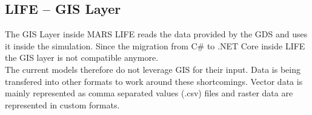 %

\subsection{LIFE -- GIS Layer}
The GIS Layer inside MARS LIFE reads the data provided by the GDS and uses it inside the simulation. Since the migration from C\# to .NET Core inside LIFE the GIS layer is not compatible anymore.\\
The current models therefore do not leverage GIS for their input. Data is being transfered into other formats to work around these shortcomings. Vector data is mainly represented as comma separated values (.csv) files and raster data are represented in custom formats.



